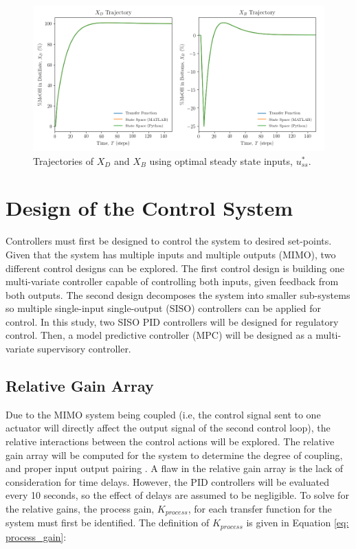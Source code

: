 \begin{figure}[h]
     \centering
      \includegraphics[scale=0.42]{images/optimal_input_plots.png}
     \caption{Trajectories of $X_D$ and $X_B$ using optimal steady state inputs, $u_{ss}^*.$}
     \label{fig: optimal_ss_xd_xb}
\end{figure}

\section{Design of the Control System}
Controllers must first be designed to control the system to desired set-points.  Given that the system has multiple inputs and multiple outputs (MIMO), two different control designs can be explored.  The first control design is building one multi-variate controller capable of controlling both inputs, given feedback from both outputs.  The second design decomposes the system into smaller sub-systems so multiple single-input single-output (SISO) controllers can be applied for control.  In this study, two SISO PID controllers will be designed for regulatory control.  Then, a model predictive controller (MPC) will be designed as a multi-variate supervisory controller.  

\subsection{Relative Gain Array}
Due to the MIMO system being coupled (i.e, the control signal sent to one actuator will directly affect the output signal of the second control loop), the relative interactions between the control actions will be explored.  The relative gain array will be computed for the system to determine the degree of coupling, and proper input output pairing \cite{RGA}. A flaw in the relative gain array is the lack of consideration for time delays.  However, the PID controllers will be evaluated every 10 seconds, so the effect of delays are assumed to be negligible.  To solve for the relative gains, the process gain, $K_{process}$, for each transfer function for the system must first be identified.  The definition of $K_{process}$ is given in Equation \ref{eq: process_gain}:

